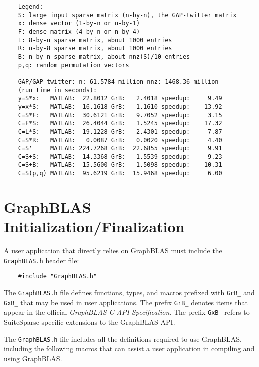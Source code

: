 \documentclass[12pt]{article}
\begin{document}
{\footnotesize
\begin{verbatim}
    Legend:
    S: large input sparse matrix (n-by-n), the GAP-twitter matrix
    x: dense vector (1-by-n or n-by-1)
    F: dense matrix (4-by-n or n-by-4)
    L: 8-by-n sparse matrix, about 1000 entries
    R: n-by-8 sparse matrix, about 1000 entries
    B: n-by-n sparse matrix, about nnz(S)/10 entries
    p,q: random permutation vectors

    GAP/GAP-twitter: n: 61.5784 million nnz: 1468.36 million
    (run time in seconds):
    y=S*x:   MATLAB:  22.8012 GrB:   2.4018 speedup:     9.49
    y=x*S:   MATLAB:  16.1618 GrB:   1.1610 speedup:    13.92
    C=S*F:   MATLAB:  30.6121 GrB:   9.7052 speedup:     3.15
    C=F*S:   MATLAB:  26.4044 GrB:   1.5245 speedup:    17.32
    C=L*S:   MATLAB:  19.1228 GrB:   2.4301 speedup:     7.87
    C=S*R:   MATLAB:   0.0087 GrB:   0.0020 speedup:     4.40
    C=S'     MATLAB: 224.7268 GrB:  22.6855 speedup:     9.91
    C=S+S:   MATLAB:  14.3368 GrB:   1.5539 speedup:     9.23
    C=S+B:   MATLAB:  15.5600 GrB:   1.5098 speedup:    10.31
    C=S(p,q) MATLAB:  95.6219 GrB:  15.9468 speedup:     6.00    \end{verbatim}
}

\newpage
\section{GraphBLAS Initialization/Finalization} %
\label{init_and_fini}

A user application that directly relies on GraphBLAS must include the
\verb'GraphBLAS.h' header file:

\begin{mdframed}[userdefinedwidth=6in]
{\footnotesize
\begin{verbatim}
    #include "GraphBLAS.h"
\end{verbatim}
} \end{mdframed}

The \verb'GraphBLAS.h' file defines functions, types, and macros prefixed with
\verb'GrB_' and \verb'GxB_' that may be used in user applications.  The prefix
\verb'GrB_' denotes items that appear in the official {\em GraphBLAS C API
Specification}.  The prefix \verb'GxB_' refers to SuiteSparse-specific
extensions to the GraphBLAS API.

The \verb'GraphBLAS.h' file includes all the definitions required to use
GraphBLAS, including the following macros that can assist a user application in
compiling and using GraphBLAS.
\end{document}
